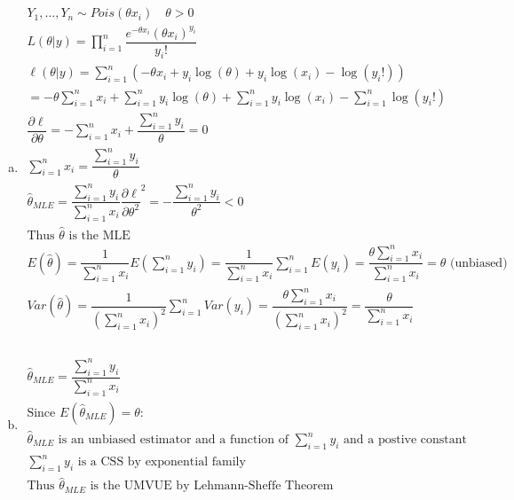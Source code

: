 \documentclass{article}
\newcommand{\sumn}{\sum_{i=1}^{n}}
\newcommand{\hth}{\hat{\theta}}
\newcommand{\prodn}{\prod_{i=1}^{n}}
\newcommand{\dll}[1]{\dfrac{\partial\ell}{\partial{#1}}}
\newcommand{\mle}{\hat{\theta}_{MLE}}
\newcommand{\sumx}{\sum_{i=1}^{n}x_i}
\newcommand{\ta}{\theta}
\begin{document}
\begin{flushleft}
\begin{enumerate}[(a)]
	\item 	
\begin{multline*}\\
Y_1,\dots, Y_n \sim Pois(\ta x_i) \quad \ta>0\\
L(\ta|y)=\prodn \dfrac{e^{-\ta x_i}(\ta x_i)^{y_i}}{y_i!}\\
\ell(\ta|y)=\sumn \left(-\ta x_i+y_i\log(\ta) +y_i\log(x_i)-\log(y_i!)\right)\\
=-\ta\sumx+\sumn y_i\log(\ta)+\sumn y_i\log(x_i) -\sumn \log(y_i!)\\
\dll{\ta}=-\sumx+\dfrac{\sumn y_i}{\ta}=0\\
\sumx=\dfrac{\sumn y_i}{\ta}\\
\mle=\dfrac{\sumn y_i}{\sumx}
\dll{\ta^2}^2=-\dfrac{\sumn y_i}{\ta^2}<0\\
\text{Thus } \hth \text{ is the MLE}\\
E(\hth)=\dfrac{1}{\sumx}E(\sumn y_i)=\dfrac{1}{\sumx}\sumn E(y_i)=\dfrac{\ta\sumx}{\sumx}=\ta \text{ (unbiased)}\\
Var(\hth)=\dfrac{1}{(\sumx)^2}\sumn Var(y_i)=\dfrac{\ta \sumx}{(\sumx)^2}=\dfrac{\ta}{\sumx}\\
\end{multline*}

	\item 
\begin{multline*}\\
\mle=\dfrac{\sumn y_i}{\sumx}\\
\text{Since } E(\mle)=\ta:\\
\mle \text{ is an unbiased estimator and a function of } \sumn y_i \text{ and a postive constant}\\
\sumn y_i \text{ is a CSS by exponential family}\\
\text{Thus } \mle \text{ is the UMVUE by Lehmann-Sheffe Theorem}\\
\end{multline*}


\end{enumerate}
\end{flushleft}
\end{document}
